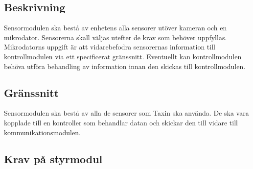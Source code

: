 \documentclass[kravspec/krav.tex]{subfiles}
\begin{document}
\subsection{Beskrivning}
Sensormodulen ska bestå av enhetens alla sensorer utöver kameran och en
mikrodator. Sensorerna skall väljas utefter de krav som behöver uppfyllas.
Mikrodatorns uppgift är att vidarebefodra sensorernas information till
kontrollmodulen via ett specificerat gränssnitt. Eventuellt kan kontrollmodulen
behöva utföra behandling av information innan den skickas till kontrollmodulen.

\subsection{Gränssnitt}
Sensormodulen ska bestå av alla de sensorer som Taxin ska använda. De ska vara kopplade till en kontroller som behandlar datan och skickar den till vidare till kommunikationsmodulen.
\subsection{Krav på styrmodul}
\begin{reqlist}
    \req{}
\end{reqlist}
\end{document}
